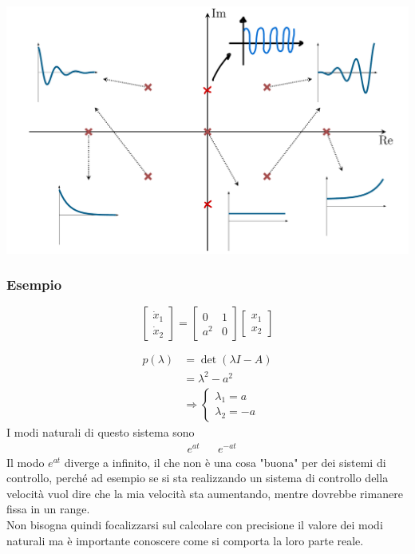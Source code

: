 \documentclass{article}
\begin{document}
\begin{center}
    \includegraphics[scale=0.23]{Images/Esempio_autovalori.png}
\end{center}

\subsubsection{Esempio}
\[
    \begin{bmatrix}
        \dot x_1\\
        \dot x_2
    \end{bmatrix}
    =
    \begin{bmatrix}
        0 & 1\\
        a^2 & 0
    \end{bmatrix}
    \begin{bmatrix}
        x_1\\
        x_2
    \end{bmatrix}
\]

\begin{align*}
    p(\lambda) &= \det (\lambda I -A)\\
    &= \lambda^2 - a^2\\
    &\Rightarrow \begin{cases}
        \lambda_1 = a\\
        \lambda_2 = -a
    \end{cases}
\end{align*}
I modi naturali di questo sistema sono 
\begin{align*}
    &e^{at} & &e^{-at}
\end{align*}
Il modo $e^{at}$ diverge a infinito, il che non è una cosa "buona" per dei sistemi di controllo, perché ad esempio se si sta realizzando un sistema di controllo della velocità vuol dire che la mia velocità sta aumentando, mentre dovrebbe rimanere fissa in un range.\\
Non bisogna quindi focalizzarsi sul calcolare con precisione il valore dei modi naturali ma è importante conoscere come si comporta la loro parte reale.
\end{document}

